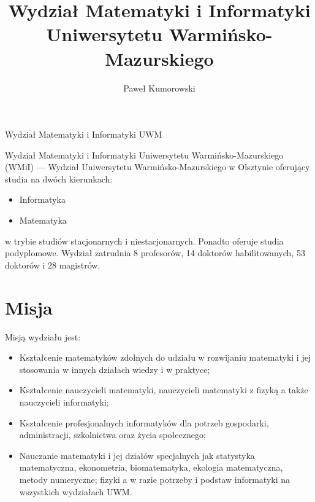 \documentclass[a4paper,12pt]{article}
\title{Wydział Matematyki i Informatyki Uniwersytetu Warmińsko-Mazurskiego}
\author{Paweł Kumorowski}
\begin{document}
\maketitle
Wydział Matematyki i Informatyki UWM
\begin{abstract}

\end{abstract}
Wydział Matematyki i Informatyki Uniwersytetu Warmińsko-Mazurskiego (WMiI) --- Wydział Uniwersytetu Warmińsko-Mazurskiego w Olsztynie oferujący studia na dwóch kierunkach:
\begin{itemize}
\item Informatyka
\item Matematyka
\end{itemize}
w trybie studiów stacjonarnych i niestacjonarnych. Ponadto oferuje studia podyplomowe.
\newline
Wydział zatrudnia 8 profesorów, 14 doktorów habilitowanych, 53 doktorów i 28 magistrów.
\tableofcontents

\section{Misja}
Misją wydziału jest:
\begin{itemize}
\item{Kształcenie matematyków zdolnych do udziału w rozwijaniu matematyki i jej stosowania w innych
działach wiedzy i w praktyce;}
\item{Kształcenie nauczycieli matematyki, nauczycieli matematyki z fizyką a także nauczycieli informatyki;}
\item{Kształcenie profesjonalnych informatyków dla potrzeb gospodarki, administracji, szkolnictwa oraz życia społecznego;}
\item{Nauczanie matematyki i jej działów specjalnych jak statystyka matematyczna, ekonometria,
biomatematyka, ekologia matematyczna, metody numeryczne; fizyki a w razie potrzeby i podstaw
informatyki na wszystkich wydziałach UWM.}
\end{itemize}
\end{document}
